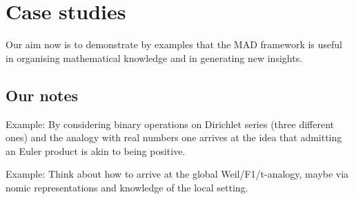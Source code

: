 
\section{Case studies}

Our aim now is to demonstrate by examples that the MAD framework is useful in organising mathematical knowledge and in generating new insights.

\subsection*{Our notes}

Example: By considering binary operations on Dirichlet series (three different ones) and the analogy with real numbers one arrives at the idea that admitting an Euler product is akin to being positive.

Example: Think about how to arrive at the global Weil/F1/t-analogy, maybe via nomic representations and knowledge of the local setting.

